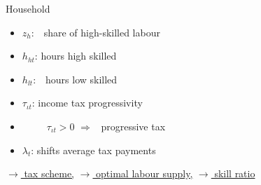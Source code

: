 \documentclass[11pt,aspectratio=169]{beamer}
\newcommand{\ar}{$\Rightarrow$ \ }
\begin{document}
\begin{frame}{Household}
\small
\vspace{4mm}
\begin{minipage}[t!]{0.4\textwidth}
	\vspace{7mm}
	\begin{itemize}
		\item[] $z_h$:\ \ share of high-skilled labour \vspace{-2mm}
		\item[] $h_{ht}$: hours high skilled\vspace{-2mm}
		\item[] $h_{lt}$:\ \ hours low skilled\vspace{-2mm}
	\end{itemize}
\end{minipage}
\begin{minipage}[t!]{0.5\textwidth}
	\vspace{8mm}
	\begin{itemize}
		\item[] $\tau_{\iota t}$: income tax progressivity \vspace{-2mm}
		\item[] \ \ \ \ \  $\tau_{\iota t}>0$ \ar progressive tax
		\vspace{-2mm}	
		\item[] $\lambda_{t}$: shifts average tax payments
	\end{itemize}
\end{minipage}


\vspace{4mm}
\hfill
\hyperlink{taxsc}{\tiny{$\rightarrow$ tax scheme,}} \hyperlink{opth}{\tiny{$\rightarrow$ optimal labour supply,}} 
\hyperlink{skillr}{\tiny{$\rightarrow$ skill ratio}}
\end{frame}
\end{document}
